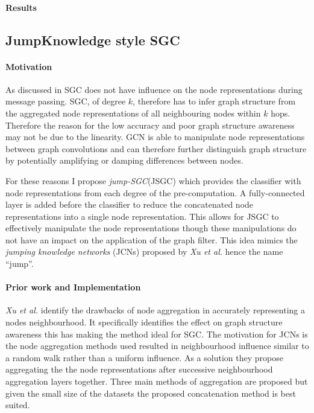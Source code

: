 \paragraph{Results}

\subsection{JumpKnowledge style SGC}
\label{sec:Jump-SGC}

\paragraph{Motivation}
As discussed in  SGC does not have influence on the node representations during message passing.
SGC, of degree $k$, therefore has to infer graph structure from the aggregated node representations of all neighbouring nodes within $k$ hops.
Therefore the reason for the low accuracy and poor graph structure awareness may not be due to the linearity.
GCN is able to manipulate node representations between graph convolutions and can therefore further distinguish graph structure by potentially amplifying or damping differences between nodes.

For these reasons I propose \emph{jump-SGC}(JSGC) which provides the classifier with node representations from each degree of the pre-computation.
A fully-connected layer is added before the classifier to reduce the concatenated node representations into a single node representation.
This allows for JSGC to effectively manipulate the node representations though these manipulations do not have an impact on the application of the graph filter.
This idea mimics the \emph{jumping knowledge networks} (JCNs) proposed by \textit{Xu et al.}\cite{xu2018representation} hence the name ``jump''.

\paragraph{Prior work and Implementation}
\textit{Xu et al.}\cite{xu2018representation} identify the drawbacks of node aggregation in accurately representing a nodes neighbourhood.
It specifically identifies the effect on graph structure awareness this has making the method ideal for SGC.
The motivation for JCNs is the node aggregation methods used resulted in neighbourhood influence similar to a random walk rather than a uniform influence.
As a solution they propose aggregating the the node representations after successive neighbourhood aggregation layers together.
Three main methods of aggregation are proposed but given the small size of the datasets the proposed concatenation method is best suited.

